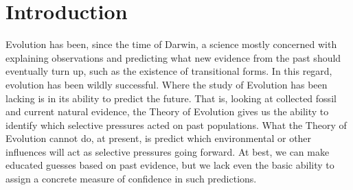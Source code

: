 \chapter{Introduction} %
\label{cha:introduction}
	Evolution has been, since the time of Darwin, a science mostly concerned with explaining observations and predicting what new evidence from the past should eventually turn up, such as the existence of transitional forms. In this regard, evolution has been wildly successful. Where the study of Evolution has been lacking is in its ability to predict the future. That is, looking at collected fossil and current natural evidence, the Theory of Evolution gives us the ability to identify which selective pressures acted on past populations. What the Theory of Evolution cannot do, at present, is predict which environmental or other influences will act as selective pressures going forward. At best, we can make educated guesses based on past evidence, but we lack even the basic ability to assign a concrete measure of confidence in such predictions.
